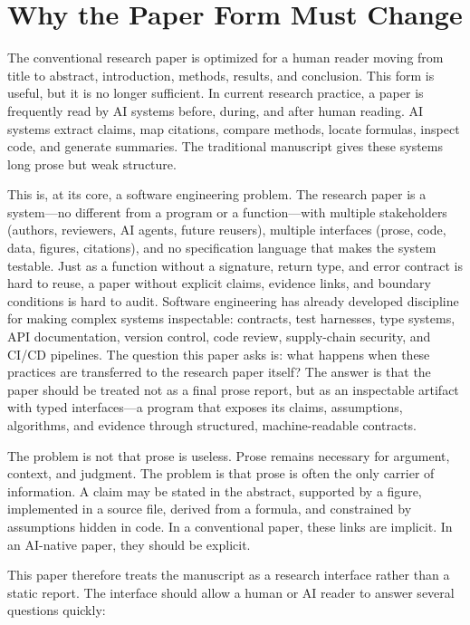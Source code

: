 \documentclass{article}
\begin{document}
\section{Why the Paper Form Must Change}

The conventional research paper is optimized for a human reader moving from title to abstract, introduction, methods, results, and conclusion. This form is useful, but it is no longer sufficient. In current research practice, a paper is frequently read by AI systems before, during, and after human reading. AI systems extract claims, map citations, compare methods, locate formulas, inspect code, and generate summaries. The traditional manuscript gives these systems long prose but weak structure.

This is, at its core, a software engineering problem. The research paper is a system---no different from a program or a function---with multiple stakeholders (authors, reviewers, AI agents, future reusers), multiple interfaces (prose, code, data, figures, citations), and no specification language that makes the system testable. Just as a function without a signature, return type, and error contract is hard to reuse, a paper without explicit claims, evidence links, and boundary conditions is hard to audit. Software engineering has already developed discipline for making complex systems inspectable: contracts, test harnesses, type systems, API documentation, version control, code review, supply-chain security, and CI/CD pipelines. The question this paper asks is: what happens when these practices are transferred to the research paper itself? The answer is that the paper should be treated not as a final prose report, but as an inspectable artifact with typed interfaces---a program that exposes its claims, assumptions, algorithms, and evidence through structured, machine-readable contracts.

The problem is not that prose is useless. Prose remains necessary for argument, context, and judgment. The problem is that prose is often the only carrier of information. A claim may be stated in the abstract, supported by a figure, implemented in a source file, derived from a formula, and constrained by assumptions hidden in code. In a conventional paper, these links are implicit. In an AI-native paper, they should be explicit.

This paper therefore treats the manuscript as a research interface rather than a static report. The interface should allow a human or AI reader to answer several questions quickly:
\end{document}
